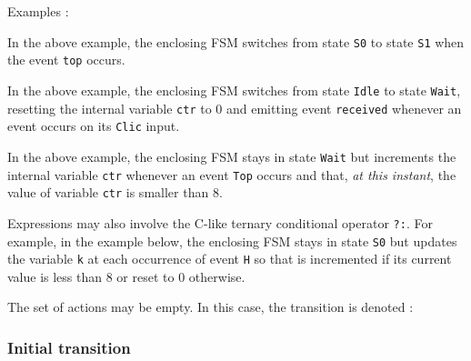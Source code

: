 \medskip
Examples :

\begin{center}
\end{center}

In the above example, the enclosing FSM switches from state \verb|S0| to state \verb|S1| when the
event \verb|top| occurs. 

\begin{center}
\end{center}

In the above example, the enclosing FSM switches from state \verb|Idle| to state \verb|Wait|, resetting the internal variable
  \verb|ctr| to 0 and emitting event \verb|received| whenever an event occurs on its \verb|Clic| input.

\begin{center}
\end{center}

In the above example, the enclosing FSM stays in state \verb|Wait| but increments the internal
variable \verb|ctr| whenever an event \verb|Top| occurs and that, \emph{at this instant}, the
value of variable \verb|ctr| is smaller than 8. 

\medskip
Expressions may also involve the C-like ternary conditional operator \verb|?:|.
For example, in the example below, the enclosing FSM stays in state \verb|S0| but updates the variable \verb|k|
at each occurrence of event \verb|H| so that is incremented if its current value is less than 8 or
reset to 0 otherwise.

\begin{center}
\end{center}

\medskip
The set of actions may be empty. In this case, the transition is denoted :

\begin{center}
\end{center}

\subsubsection*{Initial transition}
\label{sec:initial-transition}

